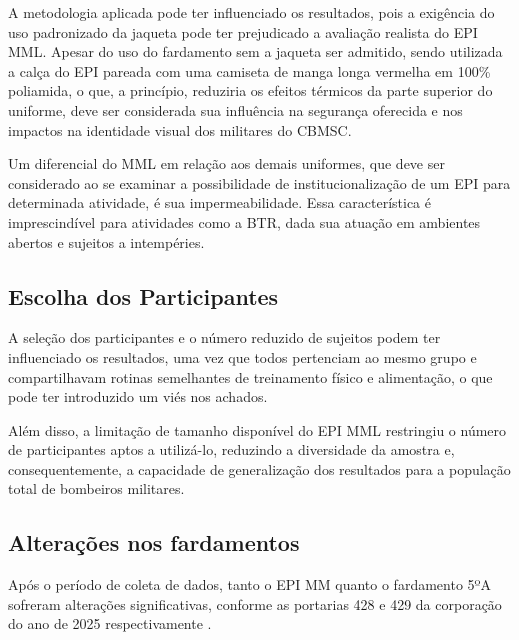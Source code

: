             A metodologia aplicada pode ter influenciado os resultados, pois a exigência do uso 
            padronizado da jaqueta pode ter prejudicado a avaliação realista do \acrshort{EPI} \acrshort{MML}.
            Apesar do uso do fardamento sem a jaqueta ser admitido, sendo utilizada a calça do \acrshort{EPI} 
            pareada com uma camiseta de manga longa vermelha em 100\% poliamida, o que, a princípio, 
            reduziria os efeitos térmicos da parte superior do uniforme, deve ser considerada sua 
            influência na segurança oferecida e nos impactos na identidade visual dos militares 
            do \acrshort{CBMSC}.

            Um diferencial do \acrshort{MML} em relação aos demais uniformes, que deve ser 
            considerado ao se examinar a possibilidade de institucionalização de um \acrshort{EPI} 
            para determinada atividade, é sua impermeabilidade. Essa característica é imprescindível 
            para atividades como a \acrlong{BTR}, dada sua atuação em ambientes abertos e sujeitos a 
            intempéries.
        
        \subsection{Escolha dos Participantes}
            A seleção dos participantes e o número reduzido de sujeitos podem ter influenciado os 
            resultados, uma vez que todos pertenciam ao mesmo grupo e compartilhavam rotinas 
            semelhantes de treinamento físico e alimentação, o que pode ter introduzido um viés nos achados.

            Além disso, a limitação de tamanho disponível do \acrshort{EPI} \acrshort{MML} restringiu o número de 
            participantes aptos a utilizá-lo, reduzindo a diversidade da amostra e, consequentemente, 
            a capacidade de generalização dos resultados para a população total de bombeiros militares.
        
        \subsection{Alterações nos fardamentos}
            Após o período de coleta de dados, tanto o EPI \acrshort{MM} quanto o fardamento 5ºA sofreram 
            alterações significativas, conforme as portarias 428 e 429 da corporação do ano de 2025 
            respectivamente \cite{portaria428MM}\cite{portaria4295A}.

